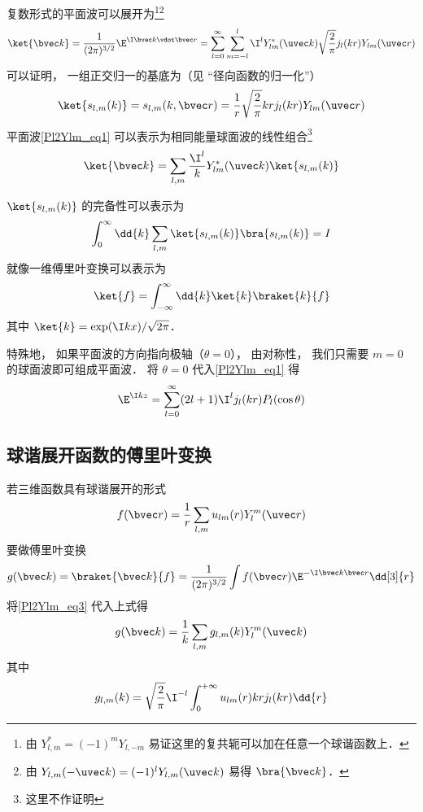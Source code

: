 

复数形式的平面波可以展开为\footnote{由 $Y_{l,m}^* = (-1)^m Y_{l,-m}$ 易证这里的复共轭可以加在任意一个球谐函数上．}\footnote{由 $Y_{l,m}(-\uvec k) = (-1)^l Y_{l,m}(\uvec k)$ 易得 $\bra{\bvec k}$．}
\begin{equation}\label{Pl2Ylm_eq1}
\ket{\bvec k} = \frac{1}{(2\pi)^{3/2}}\E^{\I \bvec k \vdot \bvec r} = \sum_{l=0}^{\infty} \sum_{m=-l}^l \I^l Y_{lm}^*(\uvec k) \sqrt{\frac{2}{\pi}} j_l(kr) Y_{lm}(\uvec r)
\end{equation}
可以证明， 一组正交归一的基底为（见 “径向函数的归一化”）
\begin{equation}
\ket{s_{l,m}(k)} = s_{l,m}(k,\bvec r) = \frac{1}{r}\sqrt{\frac{2}{\pi}}kr j_l(kr) Y_{lm}(\uvec r)
\end{equation}
平面波\autoref{Pl2Ylm_eq1} 可以表示为相同能量球面波的线性组合\footnote{这里不作证明}
\begin{equation}\label{Pl2Ylm_eq3}
\ket{\bvec k} = \sum_{l,m}\frac{\I^l}{k} Y_{lm}^*(\uvec k)\ket{s_{l,m}(k)} 
\end{equation}

$\ket{s_{l,m}(k)}$ 的完备性可以表示为
\begin{equation}
\int_0^\infty \dd{k} \sum_{l,m} \ket{s_{l,m}(k)}\bra{s_{l,m}(k)} = I
\end{equation}
就像一维傅里叶变换可以表示为%
\begin{equation}
\ket{f} = \int_{-\infty}^{\infty} \dd{k} \ket{k}\braket{k}{f}
\end{equation}
其中 $\ket{k} = \exp(\I kx)/\sqrt{2\pi}$．

特殊地， 如果平面波的方向指向极轴（$\theta = 0$）， 由对称性， 我们只需要 $m = 0$ 的球面波即可组成平面波． 将 $\theta = 0$ 代入\autoref{Pl2Ylm_eq1} 得
\begin{equation}
\E^{\I kz} = \sum_{l=0}^\infty (2l+1) \I^l j_l(kr) P_l(\cos\theta)
\end{equation}

\subsection{球谐展开函数的傅里叶变换}

若三维函数具有球谐展开的形式
\begin{equation}
f(\bvec r) = \frac{1}{r}\sum_{l,m} u_{lm}(r) Y_l^m(\uvec r)
\end{equation}
要做傅里叶变换
\begin{equation}
g(\bvec k) = \braket{\bvec k}{f} =  \frac{1}{(2\pi)^{3/2}} \int f(\bvec r) \E^{-\I \bvec k \bvec r} \dd[3]{r}
\end{equation}
将\autoref{Pl2Ylm_eq3} 代入上式得
\begin{equation}
g(\bvec k) = \frac{1}{k} \sum_{l,m} g_{l,m}(k)  Y_l^m(\uvec k) 
\end{equation}
其中
\begin{equation}
g_{l,m}(k) = \sqrt{\frac{2}{\pi}} \I^{-l} \int_0^{+\infty} u_{lm}(r) kr j_l(kr) \dd{r}
\end{equation}

